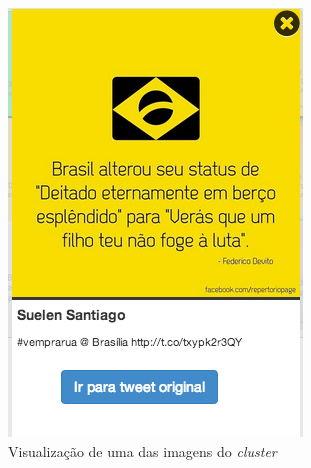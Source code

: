 \begin{figure}[h]
\begin{subfigure}[b]{0.32\textwidth}
	\includegraphics[width=0.9\linewidth]{./figures/olhopassarinho/c2_ex2_im100_1718}
	\caption{ Visualização de uma das imagens do \textit{cluster} }
	\label{subfig:im02}
	\end{subfigure}
	~
	\begin{subfigure}[b]{0.32\textwidth}
	\centering

\end{subfigure}
\end{figure}
